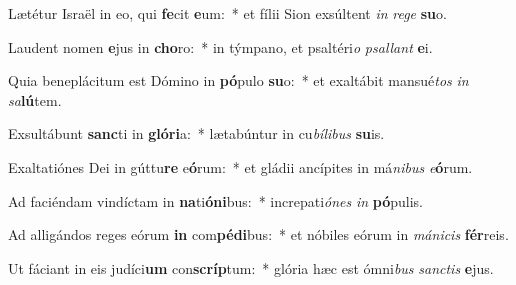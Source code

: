 \item Lætétur Israël in eo, qui \textbf{fe}cit \textbf{e}um:~* et fílii Sion exsúltent \textit{in} \textit{re}\textit{ge} \textbf{su}o.
\item Laudent nomen \textbf{e}jus in \textbf{cho}ro:~* in týmpano, et psaltéri\textit{o} \textit{psal}\textit{lant} \textbf{e}i.
\item Quia beneplácitum est Dómino in \textbf{pó}pulo \textbf{su}o:~* et exaltábit mansué\textit{tos} \textit{in} \textit{sa}\textbf{lú}tem.
\item Exsultábunt \textbf{sanc}ti in \textbf{gló}\textbf{ri}a:~* lætabúntur in cu\textit{bí}\textit{li}\textit{bus} \textbf{su}is.
\item Exaltatiónes Dei in gúttu\textbf{re} e\textbf{ó}rum:~* et gládii ancípites in má\textit{ni}\textit{bus} \textit{e}\textbf{ó}rum.
\item Ad faciéndam vindíctam in \textbf{na}ti\textbf{ó}\textbf{ni}bus:~* increpati\textit{ó}\textit{nes} \textit{in} \textbf{pó}pulis.
\item Ad alligándos reges eórum \textbf{in} com\textbf{pé}\textbf{di}bus:~* et nóbiles eórum in \textit{má}\textit{ni}\textit{cis} \textbf{fér}reis.
\item Ut fáciant in eis judíci\textbf{um} con\textbf{scríp}tum:~* glória hæc est ómni\textit{bus} \textit{sanc}\textit{tis} \textbf{e}jus.
